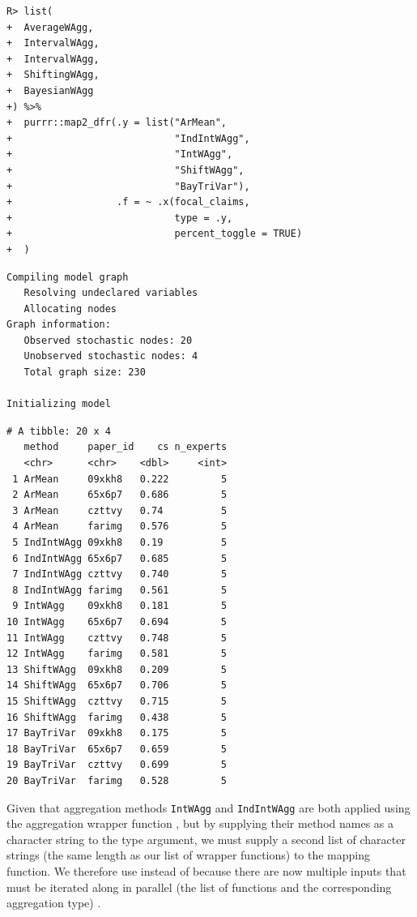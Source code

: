 \documentclass[article]{jss}
\newcommand{\fct}[1]{\code{#1()}}
\begin{document}
\begin{verbatim}
R> list(
+  AverageWAgg,
+  IntervalWAgg,
+  IntervalWAgg,
+  ShiftingWAgg,
+  BayesianWAgg
+) %>%
+  purrr::map2_dfr(.y = list("ArMean", 
+                            "IndIntWAgg", 
+                            "IntWAgg", 
+                            "ShiftWAgg", 
+                            "BayTriVar"),
+                  .f = ~ .x(focal_claims, 
+                            type = .y, 
+                            percent_toggle = TRUE)
+  )
\end{verbatim}

\begin{verbatim}
Compiling model graph
   Resolving undeclared variables
   Allocating nodes
Graph information:
   Observed stochastic nodes: 20
   Unobserved stochastic nodes: 4
   Total graph size: 230

Initializing model
\end{verbatim}

\begin{verbatim}
# A tibble: 20 x 4
   method     paper_id    cs n_experts
   <chr>      <chr>    <dbl>     <int>
 1 ArMean     09xkh8   0.222         5
 2 ArMean     65x6p7   0.686         5
 3 ArMean     czttvy   0.74          5
 4 ArMean     farimg   0.576         5
 5 IndIntWAgg 09xkh8   0.19          5
 6 IndIntWAgg 65x6p7   0.685         5
 7 IndIntWAgg czttvy   0.740         5
 8 IndIntWAgg farimg   0.561         5
 9 IntWAgg    09xkh8   0.181         5
10 IntWAgg    65x6p7   0.694         5
11 IntWAgg    czttvy   0.748         5
12 IntWAgg    farimg   0.581         5
13 ShiftWAgg  09xkh8   0.209         5
14 ShiftWAgg  65x6p7   0.706         5
15 ShiftWAgg  czttvy   0.715         5
16 ShiftWAgg  farimg   0.438         5
17 BayTriVar  09xkh8   0.175         5
18 BayTriVar  65x6p7   0.659         5
19 BayTriVar  czttvy   0.699         5
20 BayTriVar  farimg   0.528         5
\end{verbatim}

Given that aggregation methods \texttt{IntWAgg} and \texttt{IndIntWAgg}
are both applied using the aggregation wrapper function
\fct{IntervalWAgg}, but by supplying their method names as a character
string to the {type} argument, we must supply a second list of character
strings (the same length as our list of wrapper functions) to the
mapping function. We therefore use \fct{map2\_dfr} instead of
\fct{map\_dfr} because there are now multiple inputs that must be
iterated along in parallel (the list of functions and the corresponding
aggregation {type}) \citep{wickham2017b}.
\end{document}
